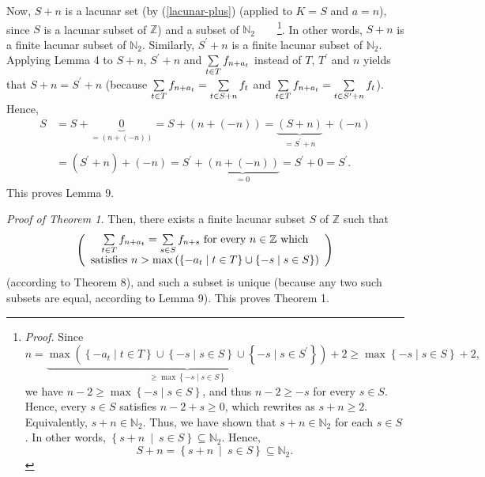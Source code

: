 \documentclass[numbers=enddot,12pt,final,onecolumn,notitlepage]{scrartcl}%
\numberwithin{exer}{section}
\theoremstyle{definition}
\let\sumnonlimits\sum
\renewcommand{\sum}{\sumnonlimits\limits}
\begin{document}
Now, $S+n$ is a lacunar set (by (\ref{lacunar-plus}) (applied to $K=S$ and
$a=n$), since $S$ is a lacunar subset of $\mathbb{Z}$) and a subset of
$\mathbb{N}_{2}$\ \ \ \ \footnote{\textit{Proof.} Since%
\[
n=\underbrace{\max\left(  \left\{  -a_{t}\mid t\in T\right\}  \cup\left\{
-s\mid s\in S\right\}  \cup\left\{  -s\mid s\in S^{\prime}\right\}  \right)
}_{\geq\max\left\{  -s\mid s\in S\right\}  }+2\geq\max\left\{  -s\mid s\in
S\right\}  +2,
\]
we have $n-2\geq\max\left\{  -s\mid s\in S\right\}  $, and thus $n-2\geq-s$
for every $s\in S$. Hence, every $s\in S$ satisfies $n-2+s\geq0$, which
rewrites as $s+n\geq2$. Equivalently, $s+n\in\mathbb{N}_{2}$. Thus, we have
shown that $s+n\in\mathbb{N}_{2}$ for each $s\in S$. In other words, $\left\{
s+n\ \mid\ s\in S\right\}  \subseteq\mathbb{N}_{2}$. Hence,
\[
S+n=\left\{  s+n\ \mid\ s\in S\right\}  \subseteq\mathbb{N}_{2}.
\]
}. In other words, $S+n$ is a finite lacunar subset of $\mathbb{N}_{2}$.
Similarly, $S^{\prime}+n$ is a finite lacunar subset of $\mathbb{N}_{2}$.
Applying Lemma 4 to $S+n$, $S^{\prime}+n$ and $\sum\limits_{t\in T}f_{n+a_{t}%
}$ instead of $T$, $T^{\prime}$ and $n$ yields that $S+n=S^{\prime}+n$
(because $\sum\limits_{t\in T}f_{n+a_{t}}=\sum\limits_{t\in S+n}f_{t}$ and
$\sum\limits_{t\in T}f_{n+a_{t}}=\sum\limits_{t\in S^{\prime}+n}f_{t}$).
Hence,%
\begin{align*}
S  &  =S+\underbrace{0}_{=\left(  n+\left(  -n\right)  \right)  }=S+\left(
n+\left(  -n\right)  \right)  =\underbrace{\left(  S+n\right)  }_{=S^{\prime
}+n}+\left(  -n\right) \\
&  =\left(  S^{\prime}+n\right)  +\left(  -n\right)  =S^{\prime}%
+\underbrace{\left(  n+\left(  -n\right)  \right)  }_{=0}=S^{\prime
}+0=S^{\prime}.
\end{align*}
This proves Lemma 9.

\textit{Proof of Theorem 1.} Then, there exists a finite lacunar subset $S$ of
$\mathbb{Z}$ such that
\[
\left(
\begin{array}
[c]{c}%
\sum\limits_{t\in T}f_{n+a_{t}}=\sum\limits_{s\in S}f_{n+s}\text{ for every
}n\in\mathbb{Z}\text{ which}\\
\text{satisfies }n>\max\left(  \left\{  -a_{t}\mid t\in T\right\}
\cup\left\{  -s\mid s\in S\right\}  \right)
\end{array}
\right)
\]
(according to Theorem 8), and such a subset is unique (because any two such
subsets are equal, according to Lemma 9). This proves Theorem 1.
\end{document}
